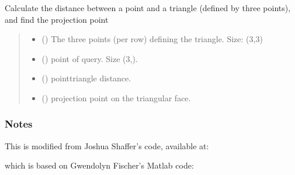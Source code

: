 \documentclass[letterpaper,10pt,english]{sphinxmanual}
\begin{document}
\begin{fulllineitems}
\label{\detokenize{_autosummary/nirfasterff.utils.pointTriangleDistance:nirfasterff.utils.pointTriangleDistance}}
\pysigstartsignatures
{}
\pysigstopsignatures
\sphinxAtStartPar
Calculate the distance between a point and a triangle (defined by three points), and find the projection point
\begin{quote}\begin{description}
\begin{itemize}
\item {} 
\sphinxAtStartPar
{} () \textendash{} The three points (per row) defining the triangle. Size: (3,3)

\item {} 
\sphinxAtStartPar
{} () \textendash{} point of query. Size (3,).

\end{itemize}

\sphinxAtStartPar
\begin{itemize}
\item {} 
\sphinxAtStartPar
{} () \textendash{} point\sphinxhyphen{}triangle distance.

\item {} 
\sphinxAtStartPar
{} () \textendash{} projection point on the triangular face.

\end{itemize}


\end{description}\end{quote}
\subsubsection*{Notes}

\sphinxAtStartPar
This is modified from Joshua Shaffer’s code, available at: 

\sphinxAtStartPar
which is based on Gwendolyn Fischer’s Matlab code: 

\end{fulllineitems}
\end{document}
